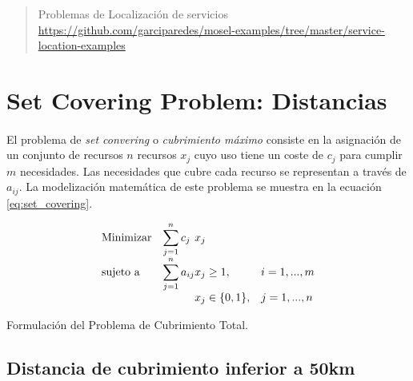 \documentclass[spanish]{article}
\begin{document}
	\maketitle %

	\thispagestyle{fancy} %



	\begin{abstract}
		\noindent Problemas de Localización de servicios \url{https://github.com/garciparedes/mosel-examples/tree/master/service-location-examples}\cite{garciparedes:mosel-examples}
	\end{abstract}



  \section{Set Covering Problem: Distancias}
	\label{sec:1}

    \paragraph{}
		El problema de \emph{set convering} o \emph{cubrimiento máximo} consiste en la asignación de un conjunto de recursos $n$ recursos $x_{j}$ cuyo uso tiene un coste de $c_{j}$ para cumplir $m$ necesidades. Las necesidades que cubre cada recurso se representan a través de $a_{ij}$. La modelización matemática de este problema se muestra en la ecuación \eqref{eq:set_covering}.


		\begin{eqfloat}
			\begin{equation}
				\begin{array}{ll@{}ll}
					\text{Minimizar}	& \displaystyle\sum\limits_{j=1}^{n} c_{j}	&	x_{j} &\\
					\text{sujeto a}		& \displaystyle\sum\limits_{j = 1}^n a_{ij}	&	x_{j} \geq 1,  &i=1 ,..., m\\
													 	&                                           &	x_{j} \in \{0,1\}, &j=1 ,..., n
				\end{array}
			\end{equation}
      \caption{Formulación del Problema de Cubrimiento Total.}
      \label{eq:set_covering}
    \end{eqfloat}

		\subsection{Distancia de cubrimiento inferior a 50km}
		\label{sec:1.1}
\end{document}
